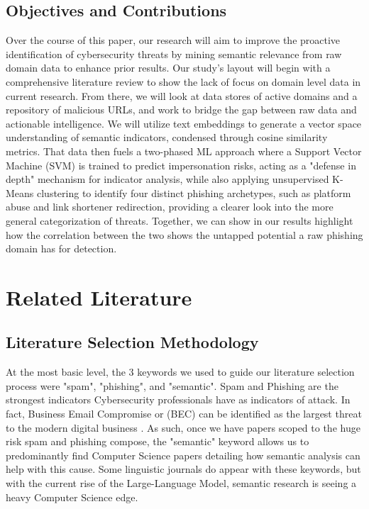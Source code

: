 \documentclass[conference]{IEEEtran}
\begin{document}
\subsection{Objectives and Contributions}
Over the course of this paper, our research will aim to improve the proactive identification of cybersecurity threats by mining semantic relevance from raw domain data to enhance prior results. Our study’s layout will begin with a comprehensive literature review to show the lack of focus on domain level data in current research. From there, we will look at data stores of active domains and a repository of malicious URLs, and work to bridge the gap between raw data and actionable intelligence. We will utilize text embeddings to generate a vector space understanding of semantic indicators, condensed through cosine similarity metrics. That data then fuels a two-phased ML approach where a Support Vector Machine (SVM) is trained to predict impersonation risks, acting as a "defense in depth" mechanism for indicator analysis, while also applying unsupervised K-Means clustering to identify four distinct phishing archetypes, such as platform abuse and link shortener redirection, providing a clearer look into the more general categorization of threats. Together, we can show in our results highlight how the correlation between the two shows the untapped potential a raw phishing domain has for detection.
\section{Related Literature}

\subsection{Literature Selection Methodology}
At the most basic level, the 3 keywords we used to guide our literature selection process were "spam", "phishing", and "semantic".
Spam and Phishing are the strongest indicators Cybersecurity professionals have as indicators of attack.
In fact, Business Email Compromise or (BEC) can be identified as the largest threat to the modern digital business \cite{saidani1}.
As such, once we have papers scoped to the huge risk spam and phishing compose, the "semantic" keyword allows us to predominantly find Computer Science papers detailing how semantic analysis can help with this cause.
Some linguistic journals do appear with these keywords, but with the current rise of the Large-Language Model, semantic research is seeing a heavy Computer Science edge.
\end{document}
